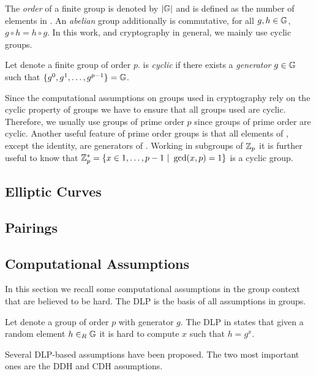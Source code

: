 \noindent
The \emph{order} of a finite group \GG is denoted by $|\mathbb{G}|$ and is defined as the number of elements in \GG.
An \emph{abelian} group additionally is commutative, \ie for all $g,h\in\mathbb{G}$, $g\circ h=h\circ g$.
In this work, and cryptography in general, we mainly use cyclic groups.

\begin{definition}\label{def:cyclicgroups}
Let \GG denote a finite group of order $p$.
\GG is \emph{cyclic} if there exists a \emph{generator} $g\in\mathbb{G}$ such that $\{g^0,g^1,\dots,g^{p-1}\}=\mathbb{G}$.
\eod
\end{definition}

\noindent
Since the computational assumptions on groups used in cryptography rely on the cyclic property of groups we have to ensure that all groups used are cyclic.
Therefore, we usually use groups of prime order $p$ since groups of prime order are cyclic.
Another useful feature of prime order groups is that all elements of \GG, except the identity, are generators of \GG.
Working in subgroups of $\mathbb{Z}_p$ it is further useful to know that $\mathbb{Z}^\ast_p=\{x\in{1,\dots,p-1}~|~\gcd(x,p)=1\}$ is a cyclic group.

\subsection{Elliptic Curves}


\subsection{Pairings}



\subsection{Computational Assumptions}
In this section we recall some computational assumptions in the group context that are believed to be hard.
The \ac{DLP} is the basis of all assumptions in groups.

\begin{definition}\label{def:dlp}
Let \GG denote a group of order $p$ with generator $g$.
The \ac{DLP} in \GG states that given a random element $h\in_R\mathbb{G}$ it is hard to compute $x$ such that $h=g^x$.
\eod
\end{definition}

\noindent
Several \ac{DLP}-based assumptions have been proposed.
The two most important ones are the \ac{DDH} and \ac{CDH} assumptions.

